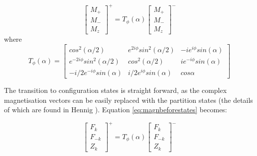 \begin{equation}\label{eq:magnbeforestates}
    \begin{bmatrix} 
    M_+ \\
    M_- \\
    M_z
    \end{bmatrix}^+ = 
        T_{\phi}(\alpha)
    \begin{bmatrix} 
    M_+ \\
    M_- \\
    M_z
    \end{bmatrix}^-
\end{equation}
where 
\begin{equation}\label{eq:woessnerFn2}
    T_{\phi}(\alpha) = 
    \begin{bmatrix}
        cos^2(\alpha/2) & e^{2i\phi} sin^2(\alpha/2) & - i e^{i \phi} sin(\alpha) \\
        e^{-2i\phi} sin^2(\alpha/2) & cos^2(\alpha/2) & i e^{-i \phi} sin(\alpha) \\
        - i/2 e^{-i \phi} sin(\alpha) & i/2 e^{i \phi} sin(\alpha) & cos \alpha
    \end{bmatrix}
\end{equation}

\hfill


The transition to configuration states is straight forward, as the complex magnetisation vectors can be easily replaced with the partition states (the details of which are found in Hennig \cite{Hennig1991}).
Equation \ref{eq:magnbeforestates} becomes:

\begin{equation}\label{eq:magnafterstates}
    \begin{bmatrix} 
    F_{k} \\
    F_{-k} \\
    Z_{k}
    \end{bmatrix}^+ = 
        T_{\phi}(\alpha)
    \begin{bmatrix} 
    F_{k} \\
    F_{-k} \\
    Z_{k}
    \end{bmatrix}^-
\end{equation}

